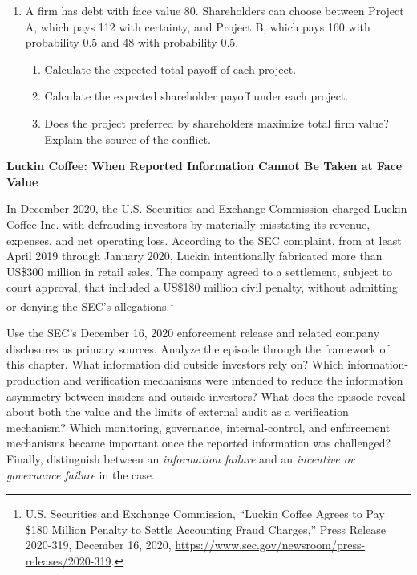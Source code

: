 \begin{enumerate}
\item A firm has debt with face value 80. Shareholders can choose between Project A, which pays 112 with certainty, and Project B, which pays 160 with probability $0.5$ and 48 with probability $0.5$.

  \begin{enumerate}

  \item Calculate the expected total payoff of each project.

  \item Calculate the expected shareholder payoff under each project.

  \item Does the project preferred by shareholders maximize total firm value? Explain the source of the conflict.

  \end{enumerate}

\end{enumerate}




\textbf{Luckin Coffee: When Reported Information Cannot Be Taken at Face Value}

In December 2020, the U.S. Securities and Exchange Commission charged Luckin Coffee Inc. with defrauding investors by materially misstating its revenue, expenses, and net operating loss. According to the SEC complaint, from at least April 2019 through January 2020, Luckin intentionally fabricated more than US\$300 million in retail sales. The company agreed to a settlement, subject to court approval, that included a US\$180 million civil penalty, without admitting or denying the SEC's allegations.\footnote{U.S. Securities and Exchange Commission, ``Luckin Coffee Agrees to Pay \$180 Million Penalty to Settle Accounting Fraud Charges,'' Press Release 2020-319, December 16, 2020, \url{https://www.sec.gov/newsroom/press-releases/2020-319}.}

Use the SEC's December 16, 2020 enforcement release and related company disclosures as primary sources. Analyze the episode through the framework of this chapter. What information did outside investors rely on? Which information-production and verification mechanisms were intended to reduce the information asymmetry between insiders and outside investors? What does the episode reveal about both the value and the limits of external audit as a verification mechanism? Which monitoring, governance, internal-control, and enforcement mechanisms became important once the reported information was challenged? Finally, distinguish between an \emph{information failure} and an \emph{incentive or governance failure} in the case.

